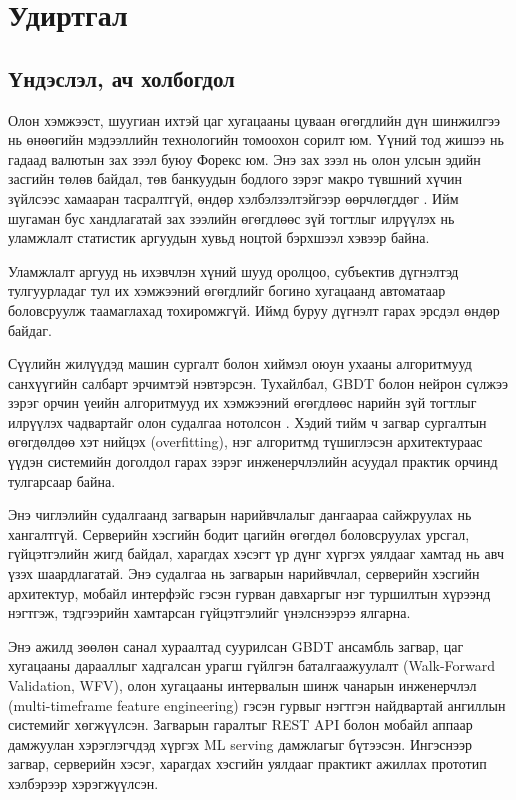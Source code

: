 \chapter{Удиртгал}
\label{ch:introduction}

\section{Үндэслэл, ач холбогдол}

Олон хэмжээст, шуугиан ихтэй цаг хугацааны цуваан өгөгдлийн дүн шинжилгээ нь өнөөгийн мэдээллийн технологийн томоохон сорилт юм. Үүний тод жишээ нь гадаад валютын зах зээл буюу Форекс юм. Энэ зах зээл нь олон улсын эдийн засгийн төлөв байдал, төв банкуудын бодлого зэрэг макро түвшний хүчин зүйлсээс хамааран тасралтгүй, өндөр хэлбэлзэлтэйгээр өөрчлөгддөг \cite{BIS2022}. Ийм шугаман бус хандлагатай зах зээлийн өгөгдлөөс зүй тогтлыг илрүүлэх нь уламжлалт статистик аргуудын хувьд ноцтой бэрхшээл хэвээр байна.

Уламжлалт аргууд нь ихэвчлэн хүний шууд оролцоо, субъектив дүгнэлтэд тулгуурладаг тул их хэмжээний өгөгдлийг богино хугацаанд автоматаар боловсруулж таамаглахад тохиромжгүй. Иймд буруу дүгнэлт гарах эрсдэл өндөр байдаг.

Сүүлийн жилүүдэд машин сургалт болон хиймэл оюун ухааны алгоритмууд санхүүгийн салбарт эрчимтэй нэвтэрсэн. Тухайлбал, GBDT болон нейрон сүлжээ зэрэг орчин үеийн алгоритмууд их хэмжээний өгөгдлөөс нарийн зүй тогтлыг илрүүлэх чадвартайг олон судалгаа нотолсон \cite{chen2016xgboost, ke2017lightgbm}. Хэдий тийм ч загвар сургалтын өгөгдөлдөө хэт нийцэх (overfitting), нэг алгоритмд түшиглэсэн архитектураас үүдэн системийн доголдол гарах зэрэг инженерчлэлийн асуудал практик орчинд тулгарсаар байна.

Энэ чиглэлийн судалгаанд загварын нарийвчлалыг дангаараа сайжруулах нь хангалтгүй. Серверийн хэсгийн бодит цагийн өгөгдөл боловсруулах урсгал, гүйцэтгэлийн жигд байдал, харагдах хэсэгт үр дүнг хүргэх уялдааг хамтад нь авч үзэх шаардлагатай. Энэ судалгаа нь загварын нарийвчлал, серверийн хэсгийн архитектур, мобайл интерфэйс гэсэн гурван давхаргыг нэг туршилтын хүрээнд нэгтгэж, тэдгээрийн хамтарсан гүйцэтгэлийг үнэлснээрээ ялгарна.

Энэ ажилд зөөлөн санал хураалтад суурилсан GBDT ансамбль загвар, цаг хугацааны дарааллыг хадгалсан урагш гүйлгэн баталгаажуулалт (Walk-Forward Validation, WFV), олон хугацааны интервалын шинж чанарын инженерчлэл (multi-timeframe feature engineering) гэсэн гурвыг нэгтгэн найдвартай ангиллын системийг хөгжүүлсэн. Загварын гаралтыг REST API болон мобайл аппаар дамжуулан хэрэглэгчдэд хүргэх ML serving дамжлагыг бүтээсэн. Ингэснээр загвар, серверийн хэсэг, харагдах хэсгийн уялдааг практикт ажиллах прототип хэлбэрээр хэрэгжүүлсэн.

